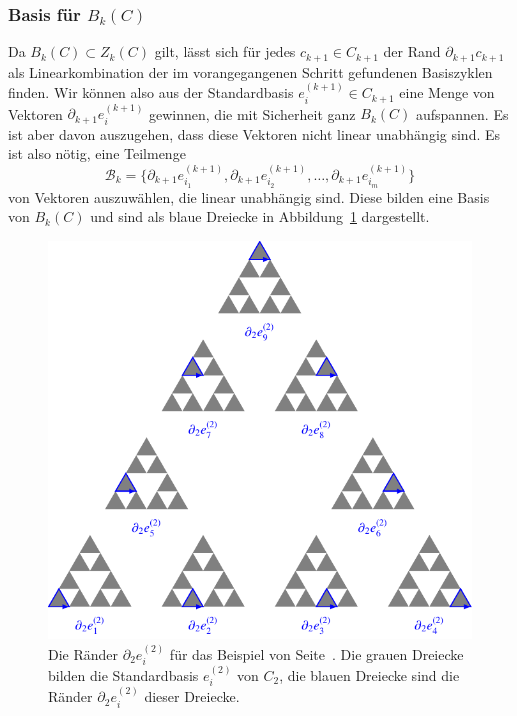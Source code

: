 \subsubsection{Basis für $B_k(C)$}
Da $B_k(C)\subset Z_k(C)$ gilt, lässt sich für jedes $c_{k+1}\in C_{k+1}$
der Rand $\partial_{k+1}c_{k+1}$ als Linearkombination der im 
vorangegangenen Schritt gefundenen Basiszyklen finden.
Wir können also aus der Standardbasis $e^{(k+1)}_i\in C_{k+1}$ eine Menge
von Vektoren $\partial_{k+1}e^{(k+1)}_i$ gewinnen, die mit Sicherheit
ganz $B_k(C)$ aufspannen.
Es ist aber davon auszugehen, dass diese Vektoren nicht linear unabhängig
sind.
Es ist also nötig, eine Teilmenge
\[
\mathcal{B}_k
=
\{
\partial_{k+1}e^{(k+1)}_{i_1},
\partial_{k+1}e^{(k+1)}_{i_2},
\dots,
\partial_{k+1}e^{(k+1)}_{i_m}
\}
\]
von Vektoren auszuwählen, die linear
unabhängig sind.
Diese bilden eine Basis von $B_k(C)$ und sind als
blaue Dreiecke in Abbildung~\ref{buch:homologie:fig:homoboundaries}
dargestellt.

\begin{figure}
\centering
\includegraphics{chapters/95-homologie/images/homoboundaries.pdf}
\caption{Die Ränder $\partial_2e_i^{(2)}$ für das Beispiel von
Seite~\pageref{buch:homologie:beispiel:gausshomo}.
Die grauen Dreiecke bilden die Standardbasis $e_i^{(2)}$ von $C_2$,
die blauen Dreiecke sind die Ränder $\partial_2e_i^{(2)}$ dieser
Dreiecke.
\label{buch:homologie:fig:homoboundaries}}
\end{figure}

